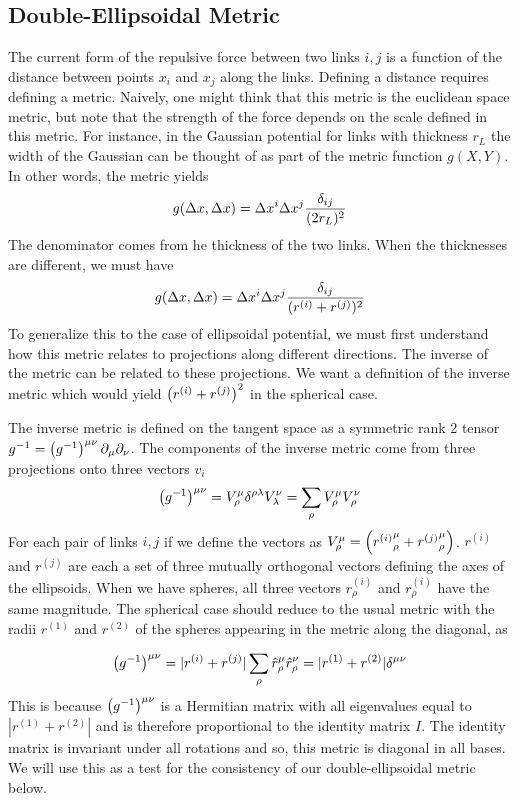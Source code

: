 \documentclass[nofootinbib,preprint,floatfix,titlepage,superscriptaddress]{revtex4} %
\begin{document}
\subsection{Double-Ellipsoidal Metric }
The current form of the repulsive force between two links $i,j$ is a function of the distance between points $x_i$ and $x_j$ along the links. 
Defining a distance requires defining a metric. 
Naively, one might think that this metric is the euclidean space metric, but note that the strength of the force depends on the scale defined in this metric. 
For instance, in the Gaussian potential for links with thickness $r_L$ the width of the Gaussian can be thought of as part of the metric function $g(X,Y)$. 
In other words, the metric yields
\[g(\Delta x, \Delta x) = \Delta x^i \Delta x^j {\delta_{ij} \over (2 r_L)^2}  \]
The denominator comes from he thickness of the two links. When the thicknesses are different, we must have
\[g(\Delta x, \Delta x) = \Delta x^i \Delta x^j {\delta_{ij} \over ( r^{(i)} +r^{(j)})^2}  \]
To generalize this to the case of ellipsoidal potential, we must first understand how this metric relates to projections along different directions. 
The inverse of the metric can be related to these projections. 
We want a definition of the inverse metric which would yield $\left(r^{(i)} +r^{(j)}\right)^2$ in the spherical case. 

The inverse metric is defined on the tangent space as a symmetric rank 2 tensor $ g^{-1} = \left(g^{-1}\right)^{\mu\nu}\partial_\mu \partial_\nu $. 
The components of the inverse metric  come from three projections onto three vectors $v_i$
\begin{equation}
    \left(g^{-1}\right)^{\mu\nu} = V^\mu_\rho \delta^{\rho \lambda} V^\nu_\lambda =  \sum_{\rho} V_\rho^\mu V_\rho^\nu \label{eq:ginv}
\end{equation}
For each pair of links $i,j$ if we define the vectors as $V_\rho^\mu =%
\pr{{r^{(i)}}_{\rho}^\mu+{r^{(j)}}_{\rho}^\mu} $. 
$r^{(i)}$ and $r^{(j)}$ are each a set of three mutually orthogonal vectors defining the axes of the ellipsoids. 
When we have spheres, all three vectors $r^{(i)}_\rho$ and $r^{(i)}_\rho$ have the same magnitude. 
The spherical case should reduce to the usual metric with the radii $r^{(1)}$ and $r^{(2)}$ of the spheres appearing in the metric along the diagonal, as 

$$ \left(g^{-1}\right)^{\mu\nu} = |r^{(i)}+r^{(j)}|\sum_{\rho} \hat{r}_\rho^\mu \hat{r}_\rho^\nu = |r^{(1)}+r^{(2)}| \delta^{\mu\nu }$$
This is because $ \left(g^{-1}\right)^{\mu\nu} $ is a Hermitian matrix with all eigenvalues equal to $|r^{(1)}+r^{(2)}|$ and is therefore proportional to the identity matrix $I$. The identity matrix is invariant under all rotations and so, this metric is diagonal in all bases.
We will use this as a test for the consistency of our double-ellipsoidal metric below. 
 
\end{document}
